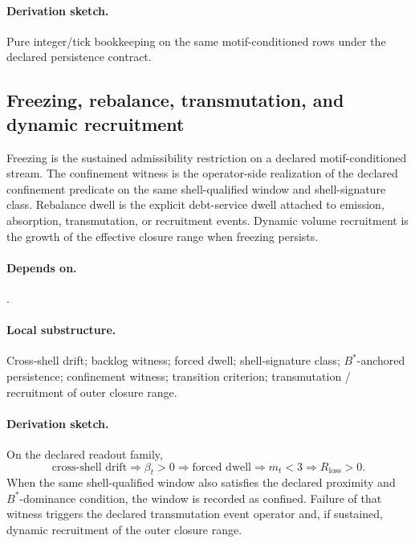 \paragraph{Derivation sketch.} Pure integer/tick bookkeeping on the same motif-conditioned rows under the declared persistence contract.

\subsection{Freezing, rebalance, transmutation, and dynamic recruitment}\label{subsec:freeze-rebalance-recruitment}
\begin{definition}
\label{def:freezing-operator}
Freezing is the sustained admissibility restriction on a declared motif-conditioned stream. The confinement witness is the operator-side realization of the declared confinement predicate on the same shell-qualified window and shell-signature class. Rebalance dwell is the explicit debt-service dwell attached to emission, absorption, transmutation, or recruitment events. Dynamic volume recruitment is the growth of the effective closure range when freezing persists.
\end{definition}

\paragraph{Depends on.} .
\paragraph{Local substructure.} Cross-shell drift; backlog witness; forced dwell; shell-signature class; $B^*$-anchored persistence; confinement witness; transition criterion; transmutation / recruitment of outer closure range.
\paragraph{Derivation sketch.} On the declared readout family,
\[
\text{cross-shell drift}\Rightarrow \beta_t>0\Rightarrow \text{forced dwell}\Rightarrow m_t<3\Rightarrow R_{\mathrm{loss}}>0.
\]
When the same shell-qualified window also satisfies the declared proximity and $B^*$-dominance condition, the window is recorded as confined. Failure of that witness triggers the declared transmutation event operator and, if sustained, dynamic recruitment of the outer closure range.


